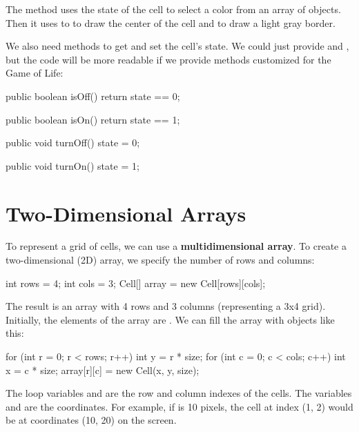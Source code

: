 The  method uses the state of the cell to select a color from an array of  objects.
Then it uses to  to draw the center of the cell and  to draw a light gray border.

We also need methods to get and set the cell's state.
We could just provide  and , but the code will be more readable if we provide methods customized for the Game of Life:

\begin{code}
public boolean isOff() {
    return state == 0;
}

public boolean isOn() {
    return state == 1;
}
\end{code}


\begin{code}
public void turnOff() {
    state = 0;
}

public void turnOn() {
    state = 1;
}
\end{code}



\section{Two-Dimensional Arrays}


To represent a grid of cells, we can use a {\bf multidimensional array}.
To create a two-dimensional (2D) array, we specify the number of rows and columns:

\begin{code}
int rows = 4;
int cols = 3;
Cell[] array = new Cell[rows][cols];
\end{code}

The result is an array with 4 rows and 3 columns (representing a 3x4 grid).
Initially, the elements of the array are .
We can fill the array with  objects like this:

\begin{code}
for (int r = 0; r < rows; r++) {
    int y = r * size;
    for (int c = 0; c < cols; c++) {
        int x = c * size;
        array[r][c] = new Cell(x, y, size);
    }
}
\end{code}

The loop variables  and  are the row and column indexes of the cells.
The variables  and  are the coordinates.
For example, if  is 10 pixels, the cell at index (1, 2) would be at coordinates (10, 20) on the screen.

